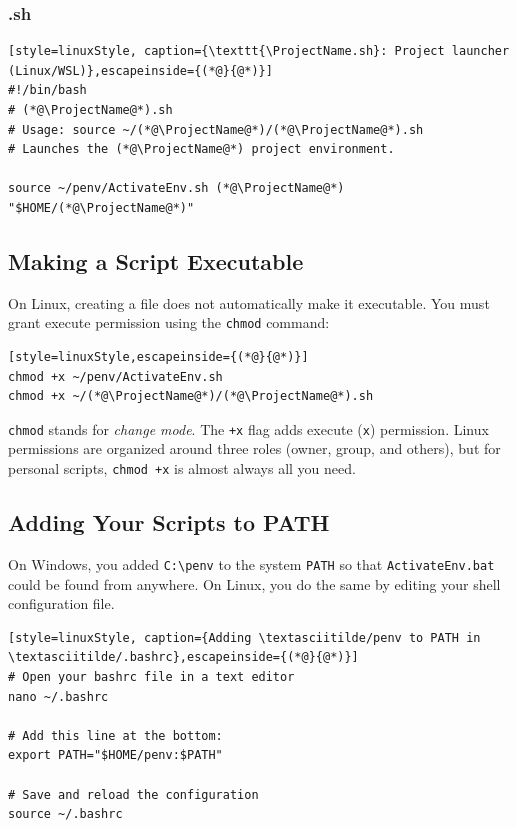 \subsubsection{\ProjectName{}.sh}

\begin{lstlisting}[style=linuxStyle, caption={\texttt{\ProjectName.sh}: Project launcher (Linux/WSL)},escapeinside={(*@}{@*)}]
#!/bin/bash
# (*@\ProjectName@*).sh
# Usage: source ~/(*@\ProjectName@*)/(*@\ProjectName@*).sh
# Launches the (*@\ProjectName@*) project environment.

source ~/penv/ActivateEnv.sh (*@\ProjectName@*) "$HOME/(*@\ProjectName@*)"
\end{lstlisting}

\subsection{Making a Script Executable}
\label{sec:chmod}

On Linux, creating a file does not automatically make it executable. You
must grant execute permission using the \texttt{chmod} command:

\begin{lstlisting}[style=linuxStyle,escapeinside={(*@}{@*)}]
chmod +x ~/penv/ActivateEnv.sh
chmod +x ~/(*@\ProjectName@*)/(*@\ProjectName@*).sh
\end{lstlisting}

\texttt{chmod} stands for \emph{change mode}. The \texttt{+x} flag adds
execute (\texttt{x}) permission. Linux permissions are organized around
three roles (owner, group, and others), but for personal scripts,
\texttt{chmod +x} is almost always all you need.

\subsection{Adding Your Scripts to PATH}

On Windows, you added \texttt{C:\textbackslash penv} to the system
\texttt{PATH} so that \texttt{ActivateEnv.bat} could be found from
anywhere. On Linux, you do the same by editing your shell configuration
file.

\begin{lstlisting}[style=linuxStyle, caption={Adding \textasciitilde/penv to PATH in \textasciitilde/.bashrc},escapeinside={(*@}{@*)}]
# Open your bashrc file in a text editor
nano ~/.bashrc

# Add this line at the bottom:
export PATH="$HOME/penv:$PATH"

# Save and reload the configuration
source ~/.bashrc
\end{lstlisting}

